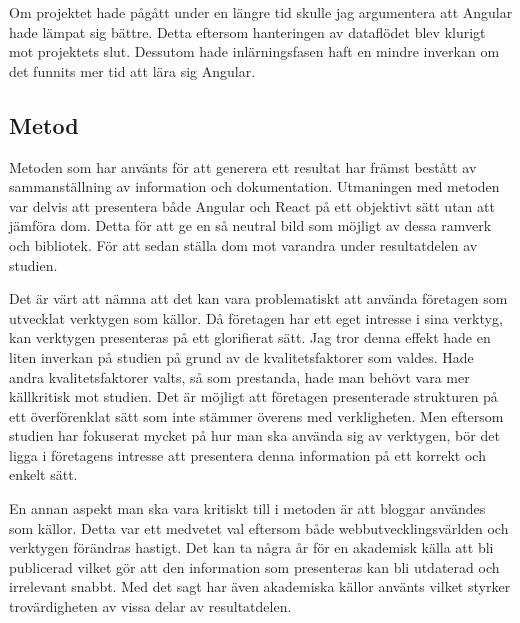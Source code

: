 Om projektet hade pågått under en längre tid skulle jag argumentera att Angular hade lämpat sig bättre. Detta eftersom hanteringen av dataflödet blev klurigt mot projektets slut. Dessutom hade inlärningsfasen haft en mindre inverkan om det funnits mer tid att lära sig Angular.

\subsection{Metod}
\label{subsec:axel-discussion-method}
Metoden som har använts för att generera ett resultat har främst bestått av sammanställning av information och dokumentation. Utmaningen med metoden var delvis att presentera både Angular och React på ett objektivt sätt utan att jämföra dom. Detta för att ge en så neutral bild som möjligt av dessa ramverk och bibliotek. För att sedan ställa dom mot varandra under resultatdelen av studien. 

Det är värt att nämna att det kan vara problematiskt att använda företagen som utvecklat verktygen som källor. Då företagen har ett eget intresse i sina verktyg, kan verktygen presenteras på ett glorifierat sätt. Jag tror denna effekt hade en liten inverkan på studien på grund av de kvalitetsfaktorer som valdes. Hade andra kvalitetsfaktorer valts, så som prestanda, hade man behövt vara mer källkritisk mot studien. Det är möjligt att företagen presenterade strukturen på ett överförenklat sätt som inte stämmer överens med verkligheten. Men eftersom studien har fokuserat mycket på hur man ska använda sig av verktygen, bör det ligga i företagens intresse att presentera denna information på ett korrekt och enkelt sätt. 

En annan aspekt man ska vara kritiskt till i metoden är att bloggar användes som källor. Detta var ett medvetet val eftersom både webbutvecklingsvärlden och verktygen förändras hastigt. Det kan ta några år för en akademisk källa att bli publicerad vilket gör att den information som presenteras kan bli utdaterad och irrelevant snabbt. Med det sagt har även akademiska källor använts vilket styrker trovärdigheten av vissa delar av resultatdelen.

\pagebreak

